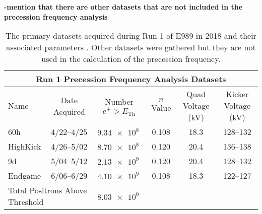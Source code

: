 \textbf{-mention that there are other datasets that are not included in the precession frequency analysis}


\begin{landscape}
\begin{table}
\centering
\setlength\tabcolsep{10pt}
\renewcommand{\arraystretch}{1.2}
\begin{tabular*}{1\linewidth}{@{\extracolsep{\fill}}lccccc}
  \hline
    \multicolumn{6}{c}{\textbf{Run 1 Precession Frequency Analysis Datasets}} \\
  \hline\hline
    Name & Date Acquired & Number $e^{+} > E_{\text{Th}}$ & $n$ Value & Quad Voltage (kV) & Kicker Voltage (kV) \\
  \hline
    60h & 4/22--4/25 & $\SI{9.34e8}{}$ & 0.108 & 18.3 & 128--132 \\
    HighKick & 4/26--5/02 & $\SI{8.70e8}{}$ & 0.120 & 20.4 & 136--138 \\
    9d & 5/04--5/12 & $\SI{2.13e9}{}$ & 0.120 & 20.4 & 128--132 \\
    Endgame & 6/06--6/29 & $\SI{4.10e9}{}$ & 0.108 & 18.3 & 122--127 \\
  \hline
    \multicolumn{2}{l}{Total Positrons Above Threshold} & \multicolumn{1}{c}{$\SI{8.03e9}{}$} & & &  \\
  \hline
\end{tabular*}
\caption[Run 1 datasets]{The primary datasets acquired during Run 1 of E989 in 2018 and their associated parameters \cite{Run1Datasets}. Other datasets were gathered but they are not used in the calculation of the precession frequency.}
\label{tab:Run1Datasets}
\end{table}
\end{landscape}



\cleardoublepage


